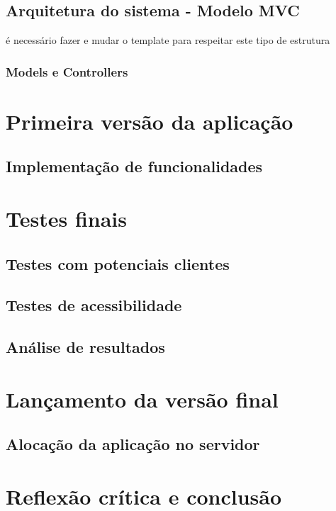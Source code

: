\documentclass[11pt, twoside]{report}
\begin{document}
	\section{Arquitetura do sistema - Modelo MVC}
	é necessário fazer e mudar o template para respeitar este tipo de estrutura
	\subsection{Models e Controllers}
	
	\chapter{Primeira versão da aplicação}
	\section{Implementação de funcionalidades}
	
	\chapter{Testes finais}
	\section{Testes com potenciais clientes}
	\section{Testes de acessibilidade}
	\section{Análise de resultados}
	
	\chapter{Lançamento da versão final}
	\section{Alocação da aplicação no servidor}
	
	
	\chapter{Reflexão crítica e conclusão}
	
	

	
	
	\pagestyle{empty}
	
\end{document}
